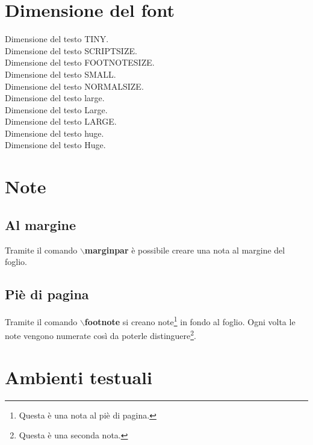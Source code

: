 \documentclass[a4paper,12pt,oneside]{book}
\theoremstyle{plain}
\begin{document}
	
	\section{Dimensione del font}
	{\tiny Dimensione del testo TINY}.\\
	{\scriptsize Dimensione del testo SCRIPTSIZE}.\\
	{\footnotesize Dimensione del testo FOOTNOTESIZE}.\\
	{\small Dimensione del testo SMALL}.\\
	{\normalsize Dimensione del testo NORMALSIZE}.\\
	{\large Dimensione del testo large}.\\
	{\Large Dimensione del testo Large}.\\
	{\LARGE Dimensione del testo LARGE}.\\
	{\huge Dimensione del testo huge}.\\
	{\Huge Dimensione del testo Huge}.
	
	
	
	\section{Note}
	\subsection{Al margine}
	Tramite il comando \textbf{$\backslash$marginpar} è possibile creare una nota al margine del foglio.
	
	\subsection{Piè di pagina}
	Tramite il comando \textbf{$\backslash$footnote} si creano note\footnote{Questa è una nota al piè di pagina.} in fondo al foglio. Ogni volta le note vengono numerate così da poterle distinguere\footnote{Questa è una seconda nota.}.
	
	
	\section{Ambienti testuali}
\end{document}
